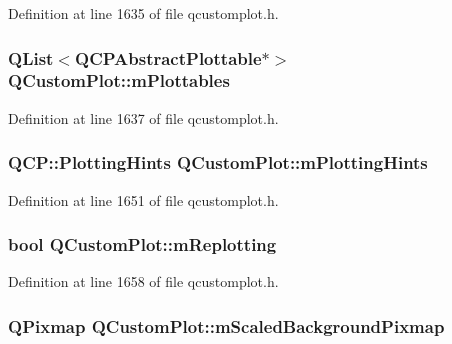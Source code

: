 Definition at line 1635 of file qcustomplot.\-h.

\hypertarget{class_q_custom_plot_a62bf8e4e7f8d23fc1e9301ba0148269f}{
\subsubsection[{m\-Plottables}]{\setlength{\rightskip}{0pt plus 5cm}Q\-List$<${\bf Q\-C\-P\-Abstract\-Plottable}$\ast$$>$ Q\-Custom\-Plot\-::m\-Plottables\hspace{0.3cm}{\ttfamily [protected]}}}\label{class_q_custom_plot_a62bf8e4e7f8d23fc1e9301ba0148269f}


Definition at line 1637 of file qcustomplot.\-h.

\hypertarget{class_q_custom_plot_aa184197a6101a9cc5807469e1d006c9e}{
\subsubsection[{m\-Plotting\-Hints}]{\setlength{\rightskip}{0pt plus 5cm}Q\-C\-P\-::\-Plotting\-Hints Q\-Custom\-Plot\-::m\-Plotting\-Hints\hspace{0.3cm}{\ttfamily [protected]}}}\label{class_q_custom_plot_aa184197a6101a9cc5807469e1d006c9e}


Definition at line 1651 of file qcustomplot.\-h.

\hypertarget{class_q_custom_plot_ab30daeca6612c3948afd368dce5f1c39}{
\subsubsection[{m\-Replotting}]{\setlength{\rightskip}{0pt plus 5cm}bool Q\-Custom\-Plot\-::m\-Replotting\hspace{0.3cm}{\ttfamily [protected]}}}\label{class_q_custom_plot_ab30daeca6612c3948afd368dce5f1c39}


Definition at line 1658 of file qcustomplot.\-h.

\hypertarget{class_q_custom_plot_a081bf046501d52642dc6d7e3bdb97d57}{
\subsubsection[{m\-Scaled\-Background\-Pixmap}]{\setlength{\rightskip}{0pt plus 5cm}Q\-Pixmap Q\-Custom\-Plot\-::m\-Scaled\-Background\-Pixmap\hspace{0.3cm}{\ttfamily [protected]}}}\label{class_q_custom_plot_a081bf046501d52642dc6d7e3bdb97d57}


